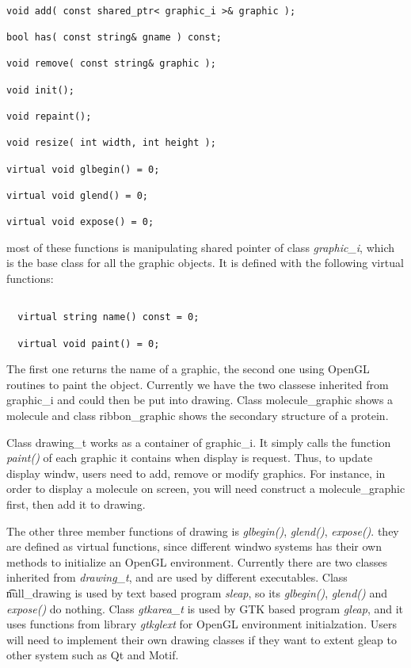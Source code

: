 \documentclass[letterpaper]{book}
\begin{document}
\begin{lstlisting}

void add( const shared_ptr< graphic_i >& graphic );

bool has( const string& gname ) const;
    
void remove( const string& graphic );
    
void init();
 
void repaint();
    
void resize( int width, int height );

virtual void glbegin() = 0;
        
virtual void glend() = 0;

virtual void expose() = 0;

\end{lstlisting}

most of these functions is manipulating shared pointer of class {\it graphic\_i}, 
which is the base class for all the graphic objects. It is defined with the 
following virtual functions:

\begin{lstlisting}

  virtual string name() const = 0;
  
  virtual void paint() = 0;

\end{lstlisting}

The first one returns the name of a graphic, the second one using OpenGL routines to
paint the object. Currently we have the two classese inherited from graphic\_i and
could then be put into drawing. Class molecule\_graphic shows a molecule and class 
ribbon\_graphic shows the secondary structure of a protein.


Class drawing\_t works as a container of graphic\_i. It simply calls the function {\it paint()} 
of each graphic it contains when display is request. Thus, to update display windw, users
need to add, remove or modify graphics. For instance, in order to display a molecule on 
screen, you will need construct a molecule\_graphic first, then add it to drawing.


The other three member functions of drawing is {\it glbegin()}, {\it glend()}, 
{\it expose()}. they are defined as virtual functions, since different windwo systems
has their own methods to initialize an OpenGL environment. Currently there are two 
classes inherited from {\it drawing\_t}, and are used by different executables. 
Class {\t null\_drawing} is used by text based program {\it sleap}, so its 
{\it glbegin()}, {\it glend()} and {\it expose()} do nothing. Class {\it gtkarea\_t}
is used by GTK based program {\it gleap}, and it uses functions from library 
{\it gtkglext} for OpenGL environment initialzation. Users will need to implement their
own drawing classes if they want to extent gleap to other system such as Qt and Motif. 
\end{document}
